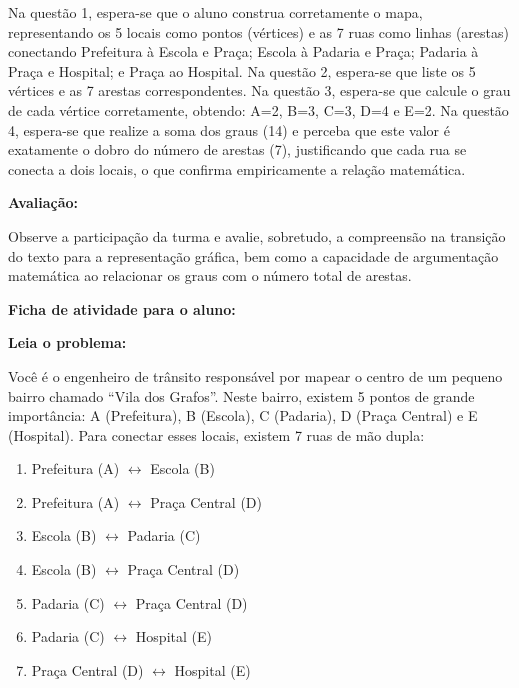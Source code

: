 \documentclass[
  12pt,
  oneside,
  a4paper,
  english,
  brazilian
  ]{abntex2}
\theoremstyle{definition}
\begin{document}
\begin{apendicesenv}
Na questão 1, espera-se que o aluno construa corretamente o mapa, representando os 5 locais como pontos (vértices) e as 7 ruas como linhas (arestas) conectando Prefeitura à Escola e Praça; Escola à Padaria e Praça; Padaria à Praça e Hospital; e Praça ao Hospital. Na questão 2, espera-se que liste os 5 vértices e as 7 arestas correspondentes. Na questão 3, espera-se que calcule o grau de cada vértice corretamente, obtendo: A=2, B=3, C=3, D=4 e E=2. Na questão 4, espera-se que realize a soma dos graus (14) e perceba que este valor é exatamente o dobro do número de arestas (7), justificando que cada rua se conecta a dois locais, o que confirma empiricamente a relação matemática.

\textbf{Avaliação:}

Observe a participação da turma e avalie, sobretudo, a compreensão na transição do texto para a representação gráfica, bem como a capacidade de argumentação matemática ao relacionar os graus com o número total de arestas.

\newpage
\begin{center}
\textbf{Ficha de atividade para o aluno:}
\end{center}

\textbf{Leia o problema:}

Você é o engenheiro de trânsito responsável por mapear o centro de um pequeno bairro chamado ``Vila dos Grafos''. Neste bairro, existem 5 pontos de grande importância: A (Prefeitura), B (Escola), C (Padaria), D (Praça Central) e E (Hospital). Para conectar esses locais, existem 7 ruas de mão dupla:

\begin{enumerate}[noitemsep]
  \item Prefeitura (A) $\leftrightarrow$ Escola (B)
  \item Prefeitura (A) $\leftrightarrow$ Praça Central (D)
  \item Escola (B) $\leftrightarrow$ Padaria (C)
  \item Escola (B) $\leftrightarrow$ Praça Central (D)
  \item Padaria (C) $\leftrightarrow$ Praça Central (D)
  \item Padaria (C) $\leftrightarrow$ Hospital (E)
  \item Praça Central (D) $\leftrightarrow$ Hospital (E)
\end{enumerate}


\end{apendicesenv}
\end{document}
